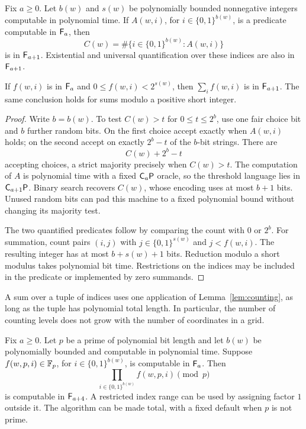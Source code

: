 \begin{lemma}\label{lem:counting}
Fix $a\ge0$.  Let $b(w)$ and $s(w)$ be polynomially bounded nonnegative
integers computable in polynomial time.  If $A(w,i)$, for
$i\in\{0,1\}^{b(w)}$, is a predicate computable in $\mathsf F_{a}$, then
\[
 C(w)=\#\{i\in\{0,1\}^{b(w)}:A(w,i)\}
\]
is in $\mathsf F_{a+1}$.  Existential and universal quantification over
these indices are also in $\mathsf F_{a+1}$.

If $f(w,i)$ is in $\mathsf F_{a}$ and $0\le f(w,i)<2^{s(w)}$, then
$\sum_i f(w,i)$ is in $\mathsf F_{a+1}$.  The same conclusion holds for
sums modulo a positive short integer.
\end{lemma}

\begin{proof}
Write $b=b(w)$.  To test $C(w)>t$ for $0\le t\le2^b$, use one fair
choice bit and $b$ further random bits.  On the first choice accept
exactly when $A(w,i)$ holds; on the second accept on exactly $2^b-t$
of the $b$-bit strings.  There are
\[
 C(w)+2^b-t
\]
accepting choices, a strict majority precisely when $C(w)>t$.
The computation of $A$ is polynomial time with a fixed
$\mathsf C_{a}\mathsf P$ oracle, so the threshold language lies in
$\mathsf C_{a+1}\mathsf P$.  Binary search recovers $C(w)$, whose encoding uses at
most $b+1$ bits.  Unused random bits can pad this machine to a fixed
polynomial bound without changing its majority test.

The two quantified predicates follow by comparing the count with $0$
or $2^b$.  For summation, count pairs $(i,j)$ with
$j\in\{0,1\}^{s(w)}$ and $j<f(w,i)$.  The resulting integer has at most
$b+s(w)+1$ bits.  Reduction modulo a short modulus takes polynomial bit
time.  Restrictions on the indices may be included in the predicate or
implemented by zero summands.
\end{proof}

A sum over a tuple of indices uses one application of
Lemma~\ref{lem:counting}, as long as the tuple has polynomial total
length.  In particular, the number of counting levels does not grow
with the number of coordinates in a grid.

\begin{lemma}\label{lem:field-product}\label{lem:product}
Fix $a\ge0$.  Let $p$ be a prime of polynomial bit length and let $b(w)$
be polynomially bounded and computable in polynomial time.  Suppose
$f(w,p,i)\in\mathbb F_p$, for $i\in\{0,1\}^{b(w)}$, is computable in
$\mathsf F_{a}$.  Then
\[
 \prod_{i\in\{0,1\}^{b(w)}} f(w,p,i)\pmod p
\]
is computable in $\mathsf F_{a+4}$.  A restricted index range can be used
by assigning factor $1$ outside it.  The algorithm can be made total,
with a fixed default when $p$ is not prime.
\end{lemma}

